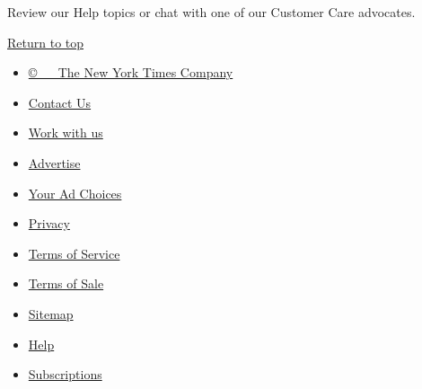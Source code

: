 Review our Help topics or chat with one of our Customer Care advocates.

\protect\hyperlink{article-container}{Return to top}

\begin{itemize}
\tightlist
\item
  \href{http://www.nytimes3xbfgragh.onion/content/help/rights/copyright/copyright-notice.html}{©~
  ~ The New York Times Company }
\end{itemize}

\begin{itemize}
\tightlist
\item
  \href{https://help.nytimes3xbfgragh.onion/hc/en-us/articles/115015385887-Contact-Us}{Contact
  Us}
\item
  \href{http://www.nytco.com/careers}{Work with us}
\item
  \href{http://nytmediakit.com/}{Advertise}
\item
  \href{https://www.nytimes3xbfgragh.onion/content/help/rights/privacy/policy/privacy-policy.html\#pp}{Your
  Ad Choices}
\item
  \href{https://www.nytimes3xbfgragh.onion/privacy}{Privacy}
\item
  \href{https://www.nytimes3xbfgragh.onion/ref/membercenter/help/agree.html}{Terms
  of Service}
\item
  \href{https://www.nytimes3xbfgragh.onion/content/help/rights/sale/terms-of-sale.html}{Terms
  of Sale}
\item
  \href{http://spiderbites.nytimes3xbfgragh.onion}{Sitemap}
\item
  \href{/hc/en-us}{Help}
\item
  \href{https://www.nytimes3xbfgragh.onion/subscriptions/Multiproduct/lp5558.html?campaignId=37WXW}{Subscriptions}
\end{itemize}
